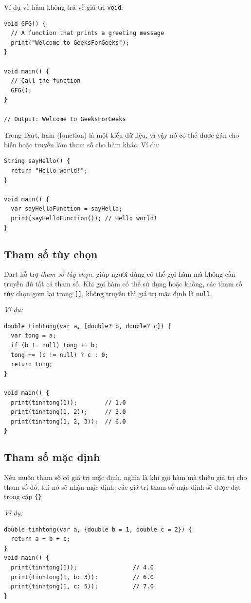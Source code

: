 \documentclass[../DoAn.tex]{subfiles}
\numberwithin{figure}{chapter}
\begin{document}
Ví dụ về hàm không trả về giá trị \texttt{void}:

\begin{lstlisting}
void GFG() {
  // A function that prints a greeting message
  print("Welcome to GeeksForGeeks");
}

void main() {
  // Call the function
  GFG();
}

// Output: Welcome to GeeksForGeeks
\end{lstlisting}

Trong Dart, hàm (function) là một kiểu dữ liệu, vì vậy nó có thể được gán cho biến hoặc truyền làm tham số cho hàm khác.
Ví dụ:
\begin{lstlisting}
String sayHello() {
  return "Hello world!";
}

void main() {
  var sayHelloFunction = sayHello;
  print(sayHelloFunction()); // Hello world!
}
\end{lstlisting}

\subsection{Tham số tùy chọn}
Dart hỗ trợ \textit{tham số tùy chọn}, giúp người dùng có thể gọi hàm mà không cần truyền đủ tất cả tham số. Khi gọi hàm có thể sử dụng hoặc không, các tham số tùy chọn gom lại trong \texttt{[]}, không truyền thì giá trị mặc định là \texttt{null}. 

\textit{Ví dụ:}
\begin{lstlisting}
double tinhtong(var a, [double? b, double? c]) {
  var tong = a;
  if (b != null) tong += b;
  tong += (c != null) ? c : 0;
  return tong;
}

void main() {
  print(tinhtong(1));        // 1.0
  print(tinhtong(1, 2));     // 3.0
  print(tinhtong(1, 2, 3));  // 6.0
}
\end{lstlisting}

\subsection{Tham số mặc định}
Nếu muốn tham số có giá trị mặc định, nghĩa là khi gọi hàm mà thiếu giá trị cho tham số đó, thì nó sẽ nhận mặc định, các giá trị tham số mặc định sẽ được đặt trong cặp \texttt{\{\}} 

\textit{Ví dụ:}
\begin{lstlisting}
double tinhtong(var a, {double b = 1, double c = 2}) {
  return a + b + c;
}
void main() {
  print(tinhtong(1));                // 4.0
  print(tinhtong(1, b: 3));          // 6.0
  print(tinhtong(1, c: 5));          // 7.0
}
\end{lstlisting}
\end{document}

